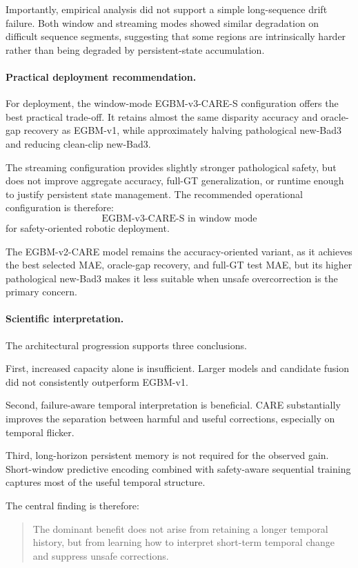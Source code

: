 \documentclass[11pt,a4paper]{article}
\begin{document}
Importantly, empirical analysis did not support a simple long-sequence drift
failure. Both window and streaming modes showed similar degradation on difficult
sequence segments, suggesting that some regions are intrinsically harder rather
than being degraded by persistent-state accumulation.

\paragraph{Practical deployment recommendation.}
For deployment, the window-mode EGBM-v3-CARE-S configuration offers the best
practical trade-off. It retains almost the same disparity accuracy and oracle-gap
recovery as EGBM-v1, while approximately halving pathological new-Bad3 and
reducing clean-clip new-Bad3.

The streaming configuration provides slightly stronger pathological safety, but
does not improve aggregate accuracy, full-GT generalization, or runtime enough to
justify persistent state management. The recommended operational configuration
is therefore:
\begin{equation}
    \boxed{
    \text{EGBM-v3-CARE-S in window mode}
    }
\end{equation}
for safety-oriented robotic deployment.

The EGBM-v2-CARE model remains the accuracy-oriented variant, as it achieves the
best selected MAE, oracle-gap recovery, and full-GT test MAE, but its higher
pathological new-Bad3 makes it less suitable when unsafe overcorrection is the
primary concern.

\paragraph{Scientific interpretation.}
The architectural progression supports three conclusions.

First, increased capacity alone is insufficient. Larger models and candidate
fusion did not consistently outperform EGBM-v1.

Second, failure-aware temporal interpretation is beneficial. CARE substantially
improves the separation between harmful and useful corrections, especially on
temporal flicker.

Third, long-horizon persistent memory is not required for the observed gain.
Short-window predictive encoding combined with safety-aware sequential training
captures most of the useful temporal structure.

The central finding is therefore:
\begin{quote}
The dominant benefit does not arise from retaining a longer temporal history,
but from learning how to interpret short-term temporal change and suppress
unsafe corrections.
\end{quote}
\end{document}
